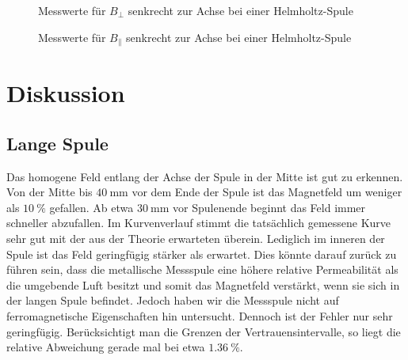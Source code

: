 \begin{figure}[H]
\centering
{}
\caption{Messwerte für $B_\bot$ senkrecht zur Achse bei einer Helmholtz-Spule}
\label{fig:radialsenkrechthelm}
\end{figure}
\begin{figure}[H]
\centering
{}
\caption{Messwerte für $B_\parallel$ senkrecht zur Achse bei einer Helmholtz-Spule}
\label{fig:axialsenkrechthelm}
\end{figure}
\section{Diskussion}
\subsection{Lange Spule}
Das homogene Feld entlang der Achse der Spule in der Mitte ist gut zu erkennen. Von der Mitte bis $ \SI{40}{\milli\meter} $ vor dem Ende der Spule ist das Magnetfeld um weniger als $ \SI{10}{\percent} $ gefallen. Ab etwa $ \SI{30}{\milli\meter} $ vor Spulenende beginnt das Feld immer schneller abzufallen. Im Kurvenverlauf stimmt die tatsächlich gemessene Kurve sehr gut mit der aus der Theorie erwarteten überein. Lediglich im inneren der Spule ist das Feld geringfügig stärker als erwartet. Dies könnte darauf zurück zu führen sein, dass die metallische Messspule eine höhere relative Permeabilität als die umgebende Luft besitzt und somit das Magnetfeld verstärkt, wenn sie sich in der langen Spule befindet. Jedoch haben wir die Messspule nicht auf ferromagnetische Eigenschaften hin untersucht. Dennoch ist der Fehler nur sehr geringfügig. Berücksichtigt man die Grenzen der Vertrauensintervalle, so liegt die relative Abweichung gerade mal bei etwa $ \SI{1.36}{\percent} $.

